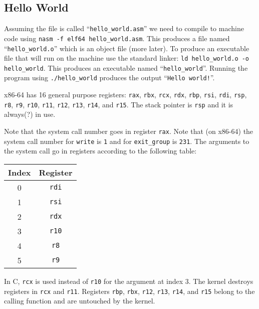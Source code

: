\subsection{Hello World}



Assuming the file is called ``\texttt{hello\_world.asm}'' we need to
compile to machine code using \texttt{nasm -f elf64
  hello\_world.asm}. This produces a file named
``\texttt{hello\_world.o}'' which is an object file (more later). To
produce an executable file that will run on the machine use the standard linker:
\texttt{ld hello\_world.o -o hello\_world}. This produces an
executable named ``\texttt{hello\_world}''. Running the program
using \texttt{./hello\_world} produces the output
``\texttt{Hello world!}''.

x86-64 has 16 general purpose registers: \texttt{rax},
\texttt{rbx}, \texttt{rcx}, \texttt{rdx},
\texttt{rbp}, \texttt{rsi}, \texttt{rdi},
\texttt{rsp}, \texttt{r8}, \texttt{r9},
\texttt{r10}, \texttt{r11}, \texttt{r12},
\texttt{r13}, \texttt{r14}, and \texttt{r15}. The
stack pointer is \texttt{rsp} and it is always(?) in use.

Note that the system call number goes in register \texttt{rax}. Note
that (on x86-64) the system call number for \texttt{write} is
\texttt{1} and for \texttt{exit\_group} is \texttt{231}. The arguments
to the system call go in registers according to the following table:

{\ttfamily\begin{tabular}{c c}
  \hline
  Index & Register \\
  \hline
  0 & \texttt{rdi} \\
  1 & \texttt{rsi} \\
  2 & \texttt{rdx} \\
  3 & \texttt{r10} \\
  4 & \texttt{r8} \\
  5 & \texttt{r9} \\
\end{tabular}}

In C, \texttt{rcx} is used instead of \texttt{r10} for the
argument at index 3. The kernel destroys registers in \texttt{rcx} and
\texttt{r11}. Registers \texttt{rbp}, \texttt{rbx},
\texttt{r12}, \texttt{r13}, \texttt{r14}, and
\texttt{r15} belong to the calling function and are untouched by the
kernel.

